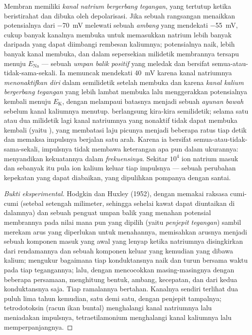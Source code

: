 \begin{proposition}[Impulsnya]\label{prop:b2:neurons-synapses:ap}
Membran  memiliki \emph{kanal natrium bergerbang tegangan},
yang tertutup ketika beristirahat dan dibuka oleh depolarisasi. Jika
sebuah rangsangan menaikkan potensialnya dari \qty{-70}{mV} melewati
sebuah \emph{ambang} yang mendekati \qty{-55}{mV}, cukup banyak
kanalnya membuka untuk memasukkan natrium lebih banyak daripada yang
dapat diimbangi rembesan kaliumnya; potensialnya naik, lebih banyak
kanal membuka, dan dalam sepersekian milidetik membrannya tersapu
menuju $E_{\mathrm{Na}}$ --- sebuah \emph{umpan balik positif} yang
meledak dan bersifat semua-atau-tidak-sama-sekali. Ia memuncak
mendekati \qty{+40}{mV} karena kanal natriumnya
\emph{menonaktifkan diri} dalam semilidetik setelah membuka dan karena
\emph{kanal kalium bergerbang tegangan} yang lebih lambat membuka lalu
menggerakkan potensialnya kembali menuju $E_{\mathrm K}$, dengan
melampaui batasnya menjadi sebuah \emph{ayunan bawah} sebelum kanal
kaliumnya menutup. \emph{} berlangsung kira-kira
semilidetik; selama satu atau dua milidetik lagi kanal natriumnya yang
nonaktif tidak dapat membuka kembali (yaitu \emph{}),
yang membatasi laju picunya menjadi beberapa ratus tiap detik dan
memaksa impulsnya berjalan satu arah. Karena ia bersifat
semua-atau-tidak-sama-sekali, impulsnya tidak membawa keterangan apa
pun dalam ukurannya:  menyandikan kekuatannya dalam
\emph{frekuensinya}. Sekitar $10^{4}$ ion natrium masuk dan sebanyak
itu pula ion kalium keluar tiap impulsnya --- sebuah perubahan kepekatan
yang dapat diabaikan, yang dipulihkan pompanya dengan santai.
\end{proposition}
\begin{proof}[Bukti eksperimental]
Hodgkin dan Huxley (1952), dengan memakai  raksasa cumi-cumi
(setebal setengah milimeter, sehingga sehelai kawat dapat diuntaikan di
dalamnya) dan sebuah penguat umpan balik yang menahan potensial
membrannya pada nilai mana pun yang dipilih (yaitu \emph{penjepit
tegangan}) sambil merekam arus yang diperlukan untuk menahannya,
memisahkan arusnya menjadi sebuah komponen masuk yang awal yang lenyap
ketika natriumnya disingkirkan dari rendamannya dan sebuah komponen
keluar yang kemudian yang dibawa kalium; mengukur bagaimana tiap
konduktansnya naik dan turun bersama waktu pada tiap tegangannya; lalu,
dengan mencocokkan masing-masingnya dengan beberapa persamaan,
menghitung bentuk, ambang, kecepatan, dan   dari kedua konduktansnya saja. Tiap ramalannya bertahan.
Kanalnya sendiri terlihat dua puluh lima tahun kemudian, satu demi
satu, dengan penjepit tampalnya; tetrodotoksin (racun ikan buntal)
menghalangi kanal natriumnya lalu meniadakan impulsnya,
tetraetilamonium menghalangi kanal kaliumnya lalu memperpanjangnya.
\end{proof}

